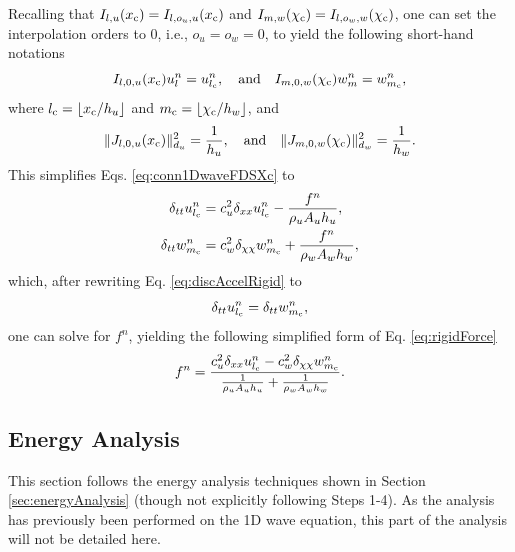 Recalling that $I_{l, u}(x_{\text{c}}) = I_{l, o_u, u}(x_{\text{c}})$ and $I_{m, w}(\chi_{\text{c}}) = I_{l, o_w, w}(\chi_{\text{c}})$, one can set the interpolation orders to 0, i.e., $o_u = o_w = 0$, to yield the following short-hand notations
\begin{equation}\label{eq:shorthandI}
    I_{l,0,u}(x_\text{c})u_l^n = u_{l_{\text{c}}}^n, \quad \text{and} \quad I_{m,0,w}(\chi_\text{c})w_m^n = w_{m_{\text{c}}}^n,
\end{equation}
where $l_\ctxt = \floor[x_\ctxt/h_u]$ and $m_\ctxt = \floor[\chi_\ctxt/h_w]$, and
\begin{equation}\label{eq:shorthandJ}
    \lVert J_{l, 0, u}(x_\text{c})\rVert_{d_u}^2 = \frac{1}{h_u}, \quad \text{and} \quad \lVert J_{m, 0, w}(\chi_\text{c})\rVert_{d_w}^2 = \frac{1}{h_w}.
\end{equation}
This simplifies Eqs. \eqref{eq:conn1DwaveFDSXc} to
\begin{subequations}\label{eq:conn1DwaveFDSXcSimple}
    \begin{align}
        \delta_{tt} u_{l_{\text{c}}}^n &= c_u^2 \delta_{xx} u_{l_{\text{c}}}^n -\frac{f^n}{\rho_u A_u h_u}, \label{eq:conn1DwaveuXcSimple} \\
        \delta_{tt} w_{m_{\text{c}}}^n &= c_w^2 \delta_{\chi\chi} w_{m_{\text{c}}}^n + \frac{f^n}{\rho_w A_w h_w},\label{eq:conn1DwavewXcSimple}
    \end{align}
\end{subequations}
which, after rewriting Eq. \eqref{eq:discAccelRigid} to
\begin{equation}
    \delta_{tt}u_{l_{\text{c}}}^n = \delta_{tt}w_{m_{\text{c}}}^n,
\end{equation}
one can solve for $f^n$, yielding the following  simplified form of Eq. \eqref{eq:rigidForce}
\begin{equation}
    f^n = \frac{c_u^2 \delta_{xx} u_{l_{\text{c}}}^n - c_w^2 \delta_{\chi\chi} w_{m_{\text{c}}}^n}{\frac{1}{\rho_u A_u h_u} + \frac{1}{\rho_w A_w h_w}}.
\end{equation}

\subsection{Energy Analysis}\label{sec:energyAnalysis1DwaveConnRigid}
This section follows the energy analysis techniques shown in Section \ref{sec:energyAnalysis} (though not explicitly following Steps 1-4). As the analysis has previously been performed on the 1D wave equation, this part of the analysis will not be detailed here. 

